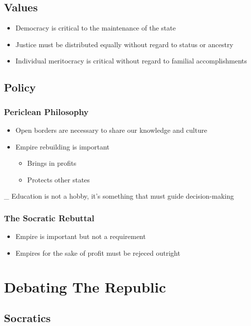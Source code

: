 \documentclass[11pt]{article}
\begin{document}
\subsection{Values}
\label{sec:org0bb463c}
\begin{itemize}
\item Democracy is critical to the maintenance of the state
\item Justice must be distributed equally without regard to status or ancestry
\item Individual meritocracy is critical without regard to familial accomplishments
\end{itemize}
\subsection{Policy}
\label{sec:org9b60954}
\subsubsection{Periclean Philosophy}
\label{sec:org059a296}
\begin{itemize}
\item Open borders are necessary to share our knowledge and culture
\item Empire rebuilding is important
\begin{itemize}
\item Brings in profits
\item Protects other states
\end{itemize}
\end{itemize}
\_ Education is not a hobby, it's something that must guide decision-making
\subsubsection{The Socratic Rebuttal}
\label{sec:org98af482}
\begin{itemize}
\item Empire is important but not a requirement
\item Empires for the sake of profit must be rejeced outright
\end{itemize}
\section{Debating The Republic}
\label{sec:orgb28133a}
\subsection{Socratics}
\label{sec:org3720411}
\end{document}
